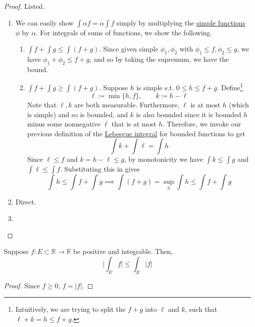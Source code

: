   \begin{proof}
    Listed. 
    \begin{enumerate}
      \item We can easily show $\int \alpha f = \alpha \int f$ simply by multiplying the \hyperref[def:simple-functions]{simple functions} $\phi$ by $\alpha$. For integrals of sums of functions, we show the following. 
      \begin{enumerate}
        \item $\int f + \int g \leq \int (f + g)$. Since given simple $\phi_1, \phi_2$ with $\phi_1 \leq f, \phi_2 \leq g$, we have $\phi_1 + \phi_2 \leq f + g$, and so by taking the supremum, we have the bound. 

        \item $\int f + \int g \geq \int (f + g)$. Suppose $h$ is simple s.t. $0 \leq h \leq f + g$. Define\footnote{Intuitively, we are trying to split the $f + g$ into $\ell$ and $k$, such that $\ell + k = h \leq f + g$.} 
          \begin{equation}
            \ell \coloneqq \min\{h, f\}, \qquad k \coloneqq h - \ell
          \end{equation}
          Note that $\ell, k$ are both measurable. Furthermore, $\ell$ is at most $h$ (which is simple) and so is bounded, and $k$ is also bounded since it is bounded $h$ minus some nonnegative $\ell$ that is at most $h$. Therefore, we invoke our previous definition of the \hyperref[def:leb-int-signed]{Lebesgue integral} for bounded functions to get 
          \begin{equation}
            \int k + \int \ell = \int h
          \end{equation}
          Since $\ell \leq f$ and $k = h - \ell \leq g$, by monotonicity we have $\int k \leq \int g$ and $\int \ell \leq \int f$. Substituting this in gives 
          \begin{equation}
            \int h \leq \int f + \int g \implies \int (f + g) = \sup_h \int h \leq \int f + \int g
          \end{equation}
        \end{enumerate}
      \item Direct. 
      \item 
    \end{enumerate}
  \end{proof}

  \begin{corollary}
    \label{thm:integral-triangle-inequality-2}
    Suppose $f: E \subset \mathbb{R} \to \mathbb{R}$ be positive and integrable. Then, 
    \begin{equation}
      \bigg| \int_E f \bigg| \leq \int_E |f| 
    \end{equation}
  \end{corollary} 
  \begin{proof}
    Since $f \geq 0$, $f = |f|$. 
  \end{proof}


